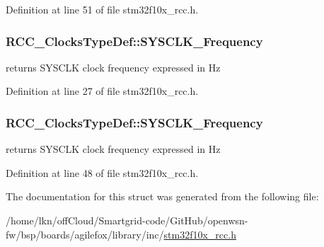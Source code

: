 Definition at line 51 of file stm32f10x\+\_\+rcc.\+h.

\subsubsection[{\texorpdfstring{S\+Y\+S\+C\+L\+K\+\_\+\+Frequency}{SYSCLK_Frequency}}]{ R\+C\+C\+\_\+\+Clocks\+Type\+Def\+::\+S\+Y\+S\+C\+L\+K\+\_\+\+Frequency}\hypertarget{struct_r_c_c___clocks_type_def_a3a220a6c71158f4bac6f13cabdc2ee2d}{}\label{struct_r_c_c___clocks_type_def_a3a220a6c71158f4bac6f13cabdc2ee2d}
returns S\+Y\+S\+C\+LK clock frequency expressed in Hz 

Definition at line 27 of file stm32f10x\+\_\+rcc.\+h.

\subsubsection[{\texorpdfstring{S\+Y\+S\+C\+L\+K\+\_\+\+Frequency}{SYSCLK_Frequency}}]{ R\+C\+C\+\_\+\+Clocks\+Type\+Def\+::\+S\+Y\+S\+C\+L\+K\+\_\+\+Frequency}\hypertarget{struct_r_c_c___clocks_type_def_a2ba325067f3d464ad7955358932563d8}{}\label{struct_r_c_c___clocks_type_def_a2ba325067f3d464ad7955358932563d8}
returns S\+Y\+S\+C\+LK clock frequency expressed in Hz 

Definition at line 48 of file stm32f10x\+\_\+rcc.\+h.



The documentation for this struct was generated from the following file\+:\begin{DoxyCompactItemize}
\item 
/home/lkn/off\+Cloud/\+Smartgrid-\/code/\+Git\+Hub/openwsn-\/fw/bsp/boards/agilefox/library/inc/\hyperlink{agilefox_2library_2inc_2stm32f10x__rcc_8h}{stm32f10x\+\_\+rcc.\+h}\end{DoxyCompactItemize}
